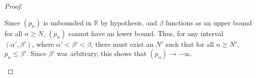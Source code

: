 \documentclass[12pt]{article}
\begin{document}
\begin{proof}
\begin{enumerate}[(i)]
\begin{enumerate}[]
                              Since $(p_{n})$ is unbounded in $\mathbb{R}$ by hypothesis,
                              and $\beta$ functions as an upper bound for all
                              $n\ge N$, $(p_{n})$ cannot have an lower bound. Thus, for any
                              interval $(\alpha', \beta')$, where $\alpha'<\beta'<\beta$,
                              there must exist an $N'$ such that for all $n\ge N'$,
                              $p_{n}\le \beta'$. Since $\beta'$ was arbitrary, this shows that 
                              $(p_{n})\to -\infty$.
                  \end{enumerate}

      \end{enumerate}


\end{proof}
\end{document}
